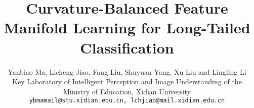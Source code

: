\documentclass[10pt,twocolumn,letterpaper]{article}
\begin{document}
\title{Curvature-Balanced Feature Manifold Learning for Long-Tailed Classification}

\author{Yanbiao Ma, Licheng Jiao, Fang Liu, Shuyuan Yang, Xu Liu and Lingling Li\\
\normalsize {Key Laboratory of Intelligent Perception and Image Understanding of the Ministry of Education, Xidian University}\\
{\tt\normalsize ybmamail@stu.xidian.edu.cn, lchjiao@mail.xidian.edu.cn}}

\iffalse
\author{\setlength{\baselineskip}{12.5pt}{\name Yanbiao Ma, Licheng Jiao, Fang Liu, Yuxin Li, Shuyuan Yang, Xu Liu \\
      \addr \normalsize Key Laboratory of Intelligent Perception and Image Understanding of the Ministry of Education, Xidian University \\ 
      \email \normalsize ybmamail@stu.xidian.edu.cn, lchjiao@mail.xidian.edu.cn, \\ f63liu@163.com, syyang@xidian.edu.cn, xuliu361@163.com 
}}
\fi

\iffalse
\author{Yanbiao Ma\\
Institution1\\
Institution1 address\\
{\tt\small firstauthor@i1.org}
\and
Second Author\\
Institution2\\
First line of institution2 address\\
{\tt\small secondauthor@i2.org}
}
\fi

\maketitle
\end{document}
